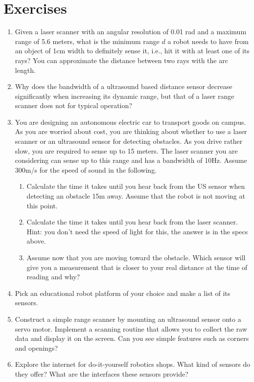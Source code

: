 \section*{Exercises}\small
\begin{enumerate}
\item Given a laser scanner with an angular resolution of 0.01 rad and a maximum range of 5.6 meters, what is the minimum range $d$ a robot needs to have from an object of 1cm width to definitely sense it, i.e., hit it with at least one of its rays? You can approximate the distance between two rays with the arc length.
\item Why does the bandwidth of a ultrasound based distance sensor decrease significantly when increasing its dynamic range, but that of a laser range scanner does not for typical operation?
\item You are designing an autonomous electric car to transport goods on campus. As you are worried about cost, you are thinking about whether to use a laser scanner or an ultrasound sensor for detecting obstacles. As you drive rather slow, you are required to sense up to 15 meters. The laser scanner you are considering can sense up to this range and has a bandwidth of 10Hz. Assume 300m/s for the speed of sound in the following.
\begin{enumerate}
\item Calculate the time it takes until you hear back from the US sensor when detecting an obstacle 15m away. Assume that the robot is not moving at this point.
\item Calculate the time it takes until you hear back from the laser scanner. Hint: you don’t need the speed of light for this, the answer is in the specs above.
\item Assume now that you are moving toward the obstacle. Which sensor will give you a measurement that is closer to your real distance at the time of reading and why?
\end{enumerate}
\item Pick an educational robot platform of your choice and make a list of its sensors.
\item Construct a simple range scanner by mounting an ultrasound sensor onto a servo motor. Implement a scanning routine that allows you to collect the raw data and display it on the screen. Can you see simple features such as corners and openings?
\item Explore the internet for do-it-yourself robotics shops. What kind of sensors do they offer? What are the interfaces these sensors provide?

\end{enumerate}
